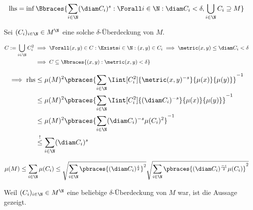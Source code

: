 \begin{solution}

\begin{align*}
    \mathrm{lhs}
    =
    \inf
    \Bbraces
    {
        \sum_{i \in \N}
            (\diam C_i)^s:
        \Forall i \in \N:
            \diam C_i < \delta,
        \bigcup_{i \in \N}
            C_i
        \supseteq
        M
    }
\end{align*}

Sei $(C_i)_{i \in \N} \in M^\N$ eine solche $\delta$-Überdeckung von $M$.

\begin{align*}
    C
    :=
    \bigcup_{i \in \N}
        C_i^2
    & \implies
    \Forall (x, y) \in C:
        \Exists i \in \N:
            (x, y) \in C_i
            \implies
            \metric(x, y)
            \leq
            \diam C_i
            <
            \delta \\
    & \implies
    C
    \subseteq
    \Bbraces{(x, y): \metric(x, y) < \delta}
\end{align*}

\begin{align*}
    \implies
    \mathrm{rhs}
    & \leq
    \mu(M)^2
    \pbraces
    {
        \sum_{i \in \N}
            \Iint[C_i^2]
            {
                \metric(x, y)^{-s}
            }{\mu(x)}{\mu(y)}
    }^{-1} \\
    & \leq
    \mu(M)^2
    \pbraces
    {
        \sum_{i \in \N}
            \Iint[C_i^2]
            {
                (\diam C_i)^{-s}
            }{\mu(x)}{\mu(y)}
    }^{-1} \\
    & \leq
    \mu(M)^2
    \pbraces
    {
        \sum_{i \in \N}
            (\diam C_i)^{-s}
            \mu(C_i)^2
    }^{-1} \\
    & \stackrel{!}{\leq}
    \sum_{i \in \N}
        (\diam C_i)^s
\end{align*}

\begin{align*}
    \mu(M)
    \leq
    \sum_{i \in \N}
        \mu(C_i)
    \leq
    \sqrt
    {
        \sum_{i \in \N}
        \pbraces
        {
            (\diam C_i)^\frac{s}{2}
        }^2
    }
    \sqrt
    {
        \sum_{i \in \N}
        \pbraces
        {
            (\diam C_i)^\frac{-s}{2}
            \mu(C_i)
        }^2
    }
\end{align*}

Weil $(C_i)_{i \in \N} \in M^\N$ eine beliebige $\delta$-Überdeckung von $M$ war, ist die Aussage gezeigt.

\end{solution}


